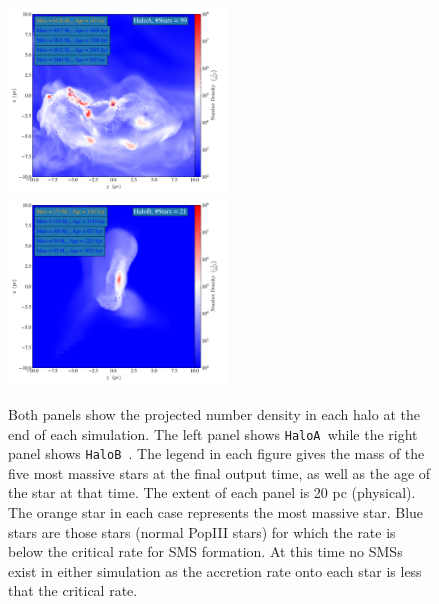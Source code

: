 \documentclass[graphics, twocolumn, usenatbib]{mn2e}
\newcommand{\ha} {\texttt{HaloA~}}
\newcommand{\hb} {\texttt{HaloB~}}
\begin{document}
\begin{figure}
\centering
\begin{minipage}{175mm}      \begin{center} 
\centerline{
\includegraphics[width=0.52\textwidth]{FIGURES/HaloA/Proj_z_number_density_2001.png}
\includegraphics[width=0.52\textwidth]{FIGURES/HaloB/Proj_z_number_density_1223.png}}
\caption{Both panels show the projected number density in each halo at the end of each simulation. The
  left panel shows \ha while the right panel shows \hb.
  The legend in each figure gives the mass of the five most massive stars at the final output time, as well as
  the age of the star at that time. The extent of each panel is 20 pc (physical). The orange
  star in each case represents the most massive star. Blue stars are those stars (normal PopIII stars) for
  which the rate is below the critical rate \citep{Sakurai_2017} for SMS formation. At this time no
  SMSs exist in either simulation
  as the accretion rate onto each star is less that the critical rate. }  \label{Fig:ProjectionEnd}
\end{center} \end{minipage}

\end{figure}
\end{document}
